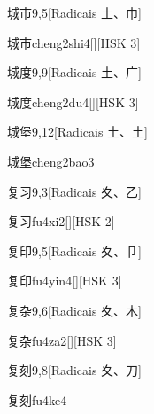 \begin{entry}{城市}{9,5}[Radicais ⼟、⼱]
  \begin{phonetics}{城市}{cheng2shi4}[][HSK 3]
  \end{phonetics}
\end{entry}

\begin{entry}{城度}{9,9}[Radicais ⼟、⼴]
  \begin{phonetics}{城度}{cheng2du4}[][HSK 3]
  \end{phonetics}
\end{entry}

\begin{entry}{城堡}{9,12}[Radicais ⼟、⼟]
  \begin{phonetics}{城堡}{cheng2bao3}
  \end{phonetics}
\end{entry}

\begin{entry}{复习}{9,3}[Radicais ⼢、⼄]
  \begin{phonetics}{复习}{fu4xi2}[][HSK 2]
  \end{phonetics}
\end{entry}

\begin{entry}{复印}{9,5}[Radicais ⼢、⼙]
  \begin{phonetics}{复印}{fu4yin4}[][HSK 3]
  \end{phonetics}
\end{entry}

\begin{entry}{复杂}{9,6}[Radicais ⼢、⽊]
  \begin{phonetics}{复杂}{fu4za2}[][HSK 3]
  \end{phonetics}
\end{entry}

\begin{entry}{复刻}{9,8}[Radicais ⼢、⼑]
  \begin{phonetics}{复刻}{fu4ke4}
  \end{phonetics}
\end{entry}

